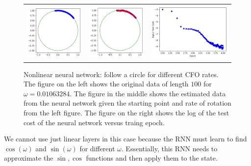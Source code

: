 \setlength{\tabcolsep}{0pt}
\begin{figure}
  \centering
  \caption{Nonlinear neural network: follow a circle for different CFO rates. The figure on the left shows the original data of length $100$ for $\omega=0.01063284$. The figure in the middle shows the estimated data from the neural network given the starting point and rate of rotation from the left figure.  The figure on the right shows the log of the test cost of the neural network versus traing epoch.}
  \begin{tabular}{ccc}
    \includegraphics[width=50mm]{figures/cfo/follow_circle_nonlinear_before.png}&
    \includegraphics[width=50mm]{figures/cfo/follow_circle_nonlinear_after.png}&
    \includegraphics[width=70mm]{figures/cfo/follow_circle_nonlinear_loss.png}\\
  \end{tabular}
  \label{fig:circle_diff_rate}
\end{figure}

We cannot use just linear layers in this case because the RNN must learn to find $\cos(\omega)$ and $\sin(\omega)$ for different $\omega$.  Essentially, this RNN needs to approximate the $\sin, \cos$ functions and then apply them to the state.

